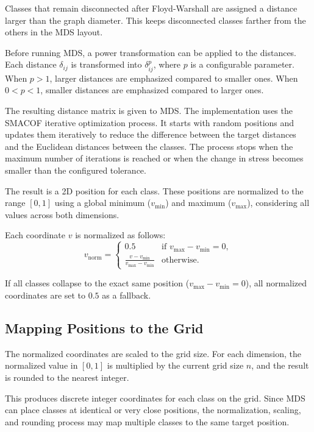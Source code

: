 \documentclass[../../main.tex]{subfiles}
\begin{document}
Classes that remain disconnected after Floyd-Warshall are assigned a distance larger than the graph diameter. This keeps disconnected classes farther from the others in the MDS layout.

Before running MDS, a power transformation can be applied to the distances. Each distance $\delta_{ij}$ is transformed into $\delta_{ij}^{p}$, where $p$ is a configurable parameter. When $p > 1$, larger distances are emphasized compared to smaller ones. When $0 < p < 1$, smaller distances are emphasized compared to larger ones.

The resulting distance matrix is given to MDS. The implementation uses the SMACOF iterative optimization process. It starts with random positions and updates them iteratively to reduce the difference between the target distances and the Euclidean distances between the classes. The process stops when the maximum number of iterations is reached or when the change in stress becomes smaller than the configured tolerance.

The result is a 2D position for each class. These positions are normalized to the range $[0,1]$ using a global minimum ($v_{\min}$) and maximum ($v_{\max}$), considering all values across both dimensions.

Each coordinate $v$ is normalized as follows:
\begin{equation}
    v_{\text{norm}} =
    \begin{cases}
        0.5 & \text{if } v_{\max} - v_{\min} = 0, \\
        \frac{v - v_{\min}}{v_{\max} - v_{\min}} & \text{otherwise.}
    \end{cases}
\end{equation}

If all classes collapse to the exact same position (\ie $v_{\max} - v_{\min} = 0$), all normalized coordinates are set to $0.5$ as a fallback.

\subsection{Mapping Positions to the Grid}

The normalized coordinates are scaled to the grid size. For each dimension, the normalized value in $[0,1]$ is multiplied by the current grid size $n$, and the result is rounded to the nearest integer.

This produces discrete integer coordinates for each class on the grid. Since MDS can place classes at identical or very close positions, the normalization, scaling, and rounding process may map multiple classes to the same target position.
\end{document}
